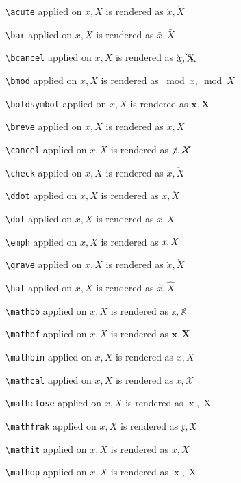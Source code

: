 \texttt{\textbackslash acute} applied on $x,X$ is rendered as $\acute{x},\acute{X}$


\texttt{\textbackslash bar} applied on $x,X$ is rendered as $\bar{x},\bar{X}$


\texttt{\textbackslash bcancel} applied on $x,X$ is rendered as $\bcancel{x},\bcancel{X}$


\texttt{\textbackslash bmod} applied on $x,X$ is rendered as $\bmod{x},\bmod{X}$


\texttt{\textbackslash boldsymbol} applied on $x,X$ is rendered as $\boldsymbol{x},\boldsymbol{X}$


\texttt{\textbackslash breve} applied on $x,X$ is rendered as $\breve{x},\breve{X}$


\texttt{\textbackslash cancel} applied on $x,X$ is rendered as $\cancel{x},\cancel{X}$


\texttt{\textbackslash check} applied on $x,X$ is rendered as $\check{x},\check{X}$


\texttt{\textbackslash ddot} applied on $x,X$ is rendered as $\ddot{x},\ddot{X}$


\texttt{\textbackslash dot} applied on $x,X$ is rendered as $\dot{x},\dot{X}$


\texttt{\textbackslash emph} applied on $x,X$ is rendered as $\emph{x},\emph{X}$


\texttt{\textbackslash grave} applied on $x,X$ is rendered as $\grave{x},\grave{X}$


\texttt{\textbackslash hat} applied on $x,X$ is rendered as $\hat{x},\hat{X}$


\texttt{\textbackslash mathbb} applied on $x,X$ is rendered as $\mathbb{x},\mathbb{X}$


\texttt{\textbackslash mathbf} applied on $x,X$ is rendered as $\mathbf{x},\mathbf{X}$


\texttt{\textbackslash mathbin} applied on $x,X$ is rendered as $\mathbin{x},\mathbin{X}$


\texttt{\textbackslash mathcal} applied on $x,X$ is rendered as $\mathcal{x},\mathcal{X}$


\texttt{\textbackslash mathclose} applied on $x,X$ is rendered as $\mathclose{x},\mathclose{X}$


\texttt{\textbackslash mathfrak} applied on $x,X$ is rendered as $\mathfrak{x},\mathfrak{X}$


\texttt{\textbackslash mathit} applied on $x,X$ is rendered as $\mathit{x},\mathit{X}$


\texttt{\textbackslash mathop} applied on $x,X$ is rendered as $\mathop{x},\mathop{X}$


